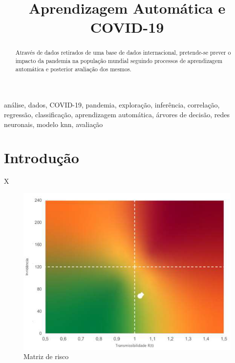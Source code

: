 \documentclass[conference]{IEEEtran}
\begin{document}
\title{Aprendizagem Automática e COVID-19\\
}

\author{
\and
{}
}

\maketitle

\begin{abstract}
Através de dados retirados de uma base de dados internacional, pretende-se prever o impacto da pandemia na população mundial seguindo processos de aprendizagem automática e posterior avaliação dos mesmos.
\end{abstract}

\begin{IEEEkeywords}
análise, dados, COVID-19, pandemia, exploração, inferência, correlação, regressão, classificação, aprendizagem automática, árvores de decisão, redes neuronais, modelo knn, avaliação
\end{IEEEkeywords}

\section{Introdução} %
X
\begin{figure}[htbp]
\centerline{\includegraphics[width=0.95\columnwidth]{images/matrix.png}}
\caption{Matriz de risco}
\label{matrix}
\end{figure}
\end{document}
